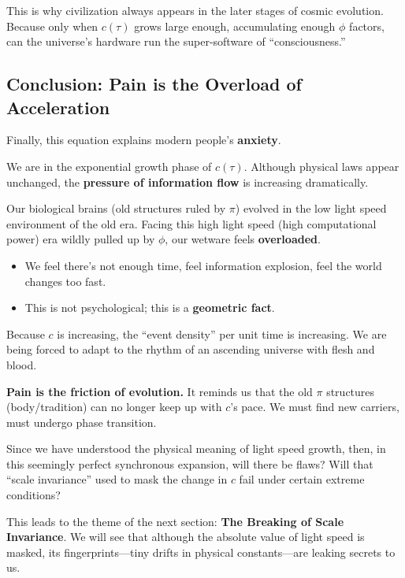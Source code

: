 This is why civilization always appears in the later stages of cosmic evolution. Because only when $c(\tau)$ grows large enough, accumulating enough $\phi$ factors, can the universe's hardware run the super-software of ``consciousness.''

\subsection{Conclusion: Pain is the Overload of Acceleration}

Finally, this equation explains modern people's \textbf{anxiety}.

We are in the exponential growth phase of $c(\tau)$. Although physical laws appear unchanged, the \textbf{pressure of information flow} is increasing dramatically.

Our biological brains (old structures ruled by $\pi$) evolved in the low light speed environment of the old era. Facing this high light speed (high computational power) era wildly pulled up by $\phi$, our wetware feels \textbf{overloaded}.

\begin{itemize}
\item We feel there's not enough time, feel information explosion, feel the world changes too fast.

\item This is not psychological; this is a \textbf{geometric fact}.
\end{itemize}

Because $c$ is increasing, the ``event density'' per unit time is increasing. We are being forced to adapt to the rhythm of an ascending universe with flesh and blood.

\textbf{Pain is the friction of evolution.} It reminds us that the old $\pi$ structures (body/tradition) can no longer keep up with $c$'s pace. We must find new carriers, must undergo phase transition.

Since we have understood the physical meaning of light speed growth, then, in this seemingly perfect synchronous expansion, will there be flaws? Will that ``scale invariance'' used to mask the change in $c$ fail under certain extreme conditions?

This leads to the theme of the next section: \textbf{The Breaking of Scale Invariance}. We will see that although the absolute value of light speed is masked, its fingerprints---tiny drifts in physical constants---are leaking secrets to us.

